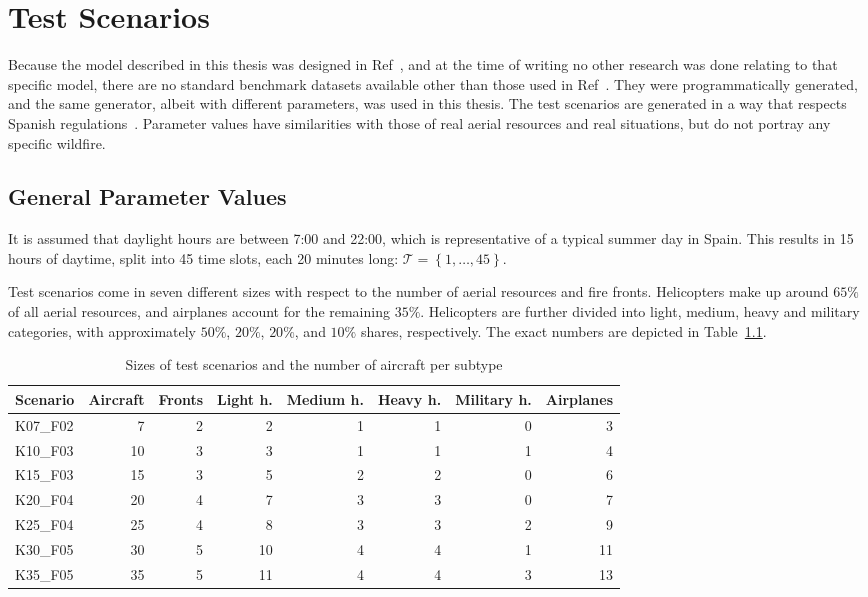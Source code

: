 \chapter{Test Scenarios}\label{chap:test-scenarios}

Because the model described in this thesis was designed in Ref~\cite{SkorinKapov/ILP}, and at the time of writing no other research was done relating to that specific model, there are no standard benchmark datasets available other than those used in Ref~\cite{SkorinKapov/ILP}.
They were programmatically generated, and the same generator, albeit with different parameters, was used in this thesis.
The test scenarios are generated in a way that respects Spanish regulations~\cite{Spain/AnnexCircular}.
Parameter values have similarities with those of real aerial resources and real situations, but do not portray any specific wildfire.


\section{General Parameter Values}

It is assumed that daylight hours are between 7:00 and 22:00, which is representative of a typical summer day in Spain.
This results in 15 hours of daytime, split into 45 time slots, each 20 minutes long: $\mathcal{T} = \left\{ 1, \ldots, 45 \right\}$.

Test scenarios come in seven different sizes with respect to the number of aerial resources and fire fronts.
Helicopters make up around $65\%$ of all aerial resources, and airplanes account for the remaining $35\%$.
Helicopters are further divided into light, medium, heavy and military categories, with approximately $50\%$, $20\%$, $20\%$, and $10\%$ shares, respectively.
The exact numbers are depicted in Table~\ref{tbl:scenario-sizes}.

\begin{table}[htb]
\caption{Sizes of test scenarios and the number of aircraft per subtype}
\label{tbl:scenario-sizes}
\centering
\footnotesize
\begin{tabular}{lrr|*5r}
Scenario & Aircraft & Fronts & Light h. & Medium h. & Heavy h. & Military h. & Airplanes \\
\midrule
K07\_F02 & 7  & 2 & 2  & 1 & 1 & 0 & 3  \\
K10\_F03 & 10 & 3 & 3  & 1 & 1 & 1 & 4  \\
K15\_F03 & 15 & 3 & 5  & 2 & 2 & 0 & 6  \\
K20\_F04 & 20 & 4 & 7  & 3 & 3 & 0 & 7  \\
K25\_F04 & 25 & 4 & 8  & 3 & 3 & 2 & 9  \\
K30\_F05 & 30 & 5 & 10 & 4 & 4 & 1 & 11 \\
K35\_F05 & 35 & 5 & 11 & 4 & 4 & 3 & 13 \\
\end{tabular}
\end{table}

